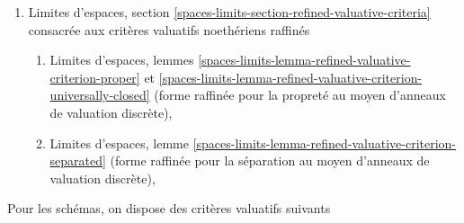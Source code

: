 \begin{enumerate}
\begin{enumerate}
(pour la propreté au moyen d'anneaux de valuation discrète et de points génériques),
\item Limites d'espaces, lemme
\ref{spaces-limits-lemma-check-universally-closed-Noetherian}
(pour le caractère universellement fermé au moyen d'anneaux de valuation discrète).
\end{enumerate}
\item Limites d'espaces, section
\ref{spaces-limits-section-refined-valuative-criteria}
consacrée aux critères valuatifs noethériens raffinés
\begin{enumerate}
\item Limites d'espaces, lemmes
\ref{spaces-limits-lemma-refined-valuative-criterion-proper} et
\ref{spaces-limits-lemma-refined-valuative-criterion-universally-closed}
(forme raffinée pour la propreté au moyen d'anneaux de valuation discrète),
\item Limites d'espaces, lemme
\ref{spaces-limits-lemma-refined-valuative-criterion-separated}
(forme raffinée pour la séparation au moyen d'anneaux de valuation discrète),
\end{enumerate}
\end{enumerate}
Pour les schémas, on dispose des critères valuatifs suivants
